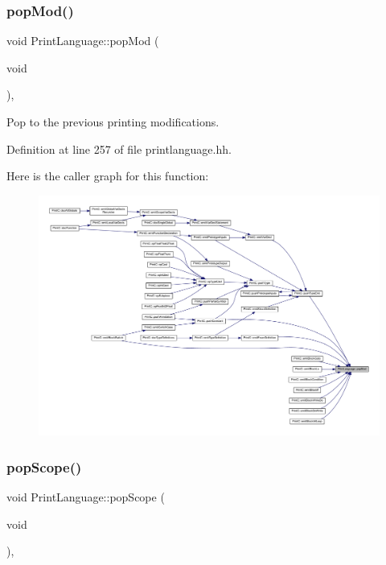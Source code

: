 \subsubsection{\texorpdfstring{popMod()}{popMod()}}
{\footnotesize\ttfamily void Print\+Language\+::pop\+Mod (\begin{DoxyParamCaption}\item[{void}]{ }\end{DoxyParamCaption})\hspace{0.3cm}{\ttfamily [inline]}, {\ttfamily [protected]}}



Pop to the previous printing modifications. 



Definition at line 257 of file printlanguage.\+hh.

Here is the caller graph for this function\+:
\nopagebreak
\begin{figure}[H]
\begin{center}
\leavevmode
\includegraphics[width=350pt]{class_print_language_a4632e44b574dba8a818163edae913cd8_icgraph}
\end{center}
\end{figure}
\mbox{\label{class_print_language_a2f80f78f12dc9c88010ca720dccc9621}} 
\subsubsection{\texorpdfstring{popScope()}{popScope()}}
{\footnotesize\ttfamily void Print\+Language\+::pop\+Scope (\begin{DoxyParamCaption}\item[{void}]{ }\end{DoxyParamCaption})\hspace{0.3cm}{\ttfamily [inline]}, {\ttfamily [protected]}}



